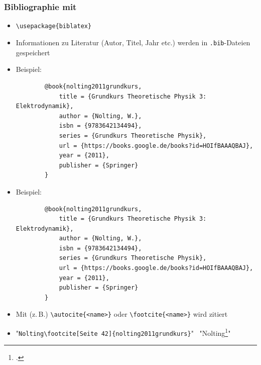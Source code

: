 \section{}

\begin{frame}[<+->][fragile]
	\frametitle{Bibliographie mit }
	
	\begin{itemize}
		\item \lstinline!\usepackage{biblatex}!
		\item Informationen zu Literatur (Autor, Titel, Jahr etc.) werden in \texttt{.bib}-Dateien gespeichert
		\item Beispiel:
		\begin{lstlisting}
		@book{nolting2011grundkurs,
		    title = {Grundkurs Theoretische Physik 3: Elektrodynamik},
		    author = {Nolting, W.},
		    isbn = {9783642134494},
		    series = {Grundkurs Theoretische Physik},
		    url = {https://books.google.de/books?id=HOIfBAAAQBAJ},
		    year = {2011},
		    publisher = {Springer}
		}
		\end{lstlisting}
	\end{itemize}
\end{frame}

\begin{frame}[<+->][fragile]
	\begin{itemize}
		\item Beispiel:
		\begin{lstlisting}
		@book{nolting2011grundkurs,
		    title = {Grundkurs Theoretische Physik 3: Elektrodynamik},
		    author = {Nolting, W.},
		    isbn = {9783642134494},
		    series = {Grundkurs Theoretische Physik},
		    url = {https://books.google.de/books?id=HOIfBAAAQBAJ},
		    year = {2011},
		    publisher = {Springer}
		}
		\end{lstlisting}
		\item Mit (z.\,B.) \lstinline!\autocite{<name>}! oder \lstinline!\footcite{<name>}! wird zitiert
		\item "\lstinline!Nolting\footcite[Seite 42]{nolting2011grundkurs}!" \textrightarrow~"Nolting\footcite[Seite 42]{nolting2011grundkurs}"
	\end{itemize}
\end{frame}

